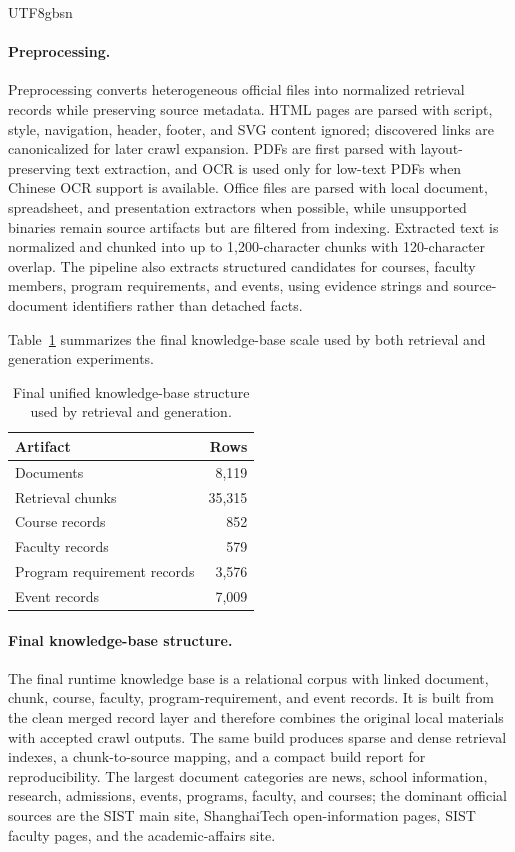\documentclass{article}
\begin{document}
\begin{CJK*}{UTF8}{gbsn}
\paragraph{Preprocessing.}
Preprocessing converts heterogeneous official files into normalized retrieval records while preserving source metadata. HTML pages are parsed with script, style, navigation, header, footer, and SVG content ignored; discovered links are canonicalized for later crawl expansion. PDFs are first parsed with layout-preserving text extraction, and OCR is used only for low-text PDFs when Chinese OCR support is available. Office files are parsed with local document, spreadsheet, and presentation extractors when possible, while unsupported binaries remain source artifacts but are filtered from indexing. Extracted text is normalized and chunked into up to 1{,}200-character chunks with 120-character overlap. The pipeline also extracts structured candidates for courses, faculty members, program requirements, and events, using evidence strings and source-document identifiers rather than detached facts.

Table~\ref{tab:corpus} summarizes the final knowledge-base scale used by both retrieval and generation experiments.

\begin{table}[H]
\centering
\small
\caption{Final unified knowledge-base structure used by retrieval and generation.}
\label{tab:corpus}
\begin{tabular}{lr}
\toprule
Artifact & Rows \\
\midrule
Documents & 8{,}119 \\
Retrieval chunks & 35{,}315 \\
Course records & 852 \\
Faculty records & 579 \\
Program requirement records & 3{,}576 \\
Event records & 7{,}009 \\
\bottomrule
\end{tabular}
\end{table}

\paragraph{Final knowledge-base structure.}
The final runtime knowledge base is a relational corpus with linked document, chunk, course, faculty, program-requirement, and event records. It is built from the clean merged record layer and therefore combines the original local materials with accepted crawl outputs. The same build produces sparse and dense retrieval indexes, a chunk-to-source mapping, and a compact build report for reproducibility. The largest document categories are news, school information, research, admissions, events, programs, faculty, and courses; the dominant official sources are the SIST main site, ShanghaiTech open-information pages, SIST faculty pages, and the academic-affairs site.


\end{CJK*}
\end{document}
